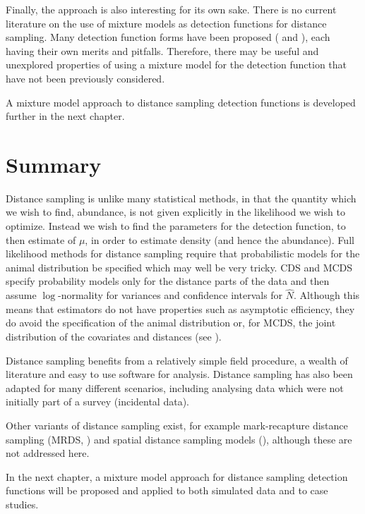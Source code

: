 Finally, the approach is also interesting for its own sake. There is no current literature on the use of mixture models as detection functions for distance sampling. Many detection function forms have been proposed (\cite{buckland92} and  \cite{gammadetfct}), each having their own merits and pitfalls. Therefore, there may be useful and unexplored properties of using a mixture model for the detection function that have not been previously considered.

A mixture model approach to distance sampling detection functions is developed further in the next chapter.

\section{Summary}
\label{cor-7s13}
Distance sampling is unlike many statistical methods, in that the quantity which we wish to find, abundance, is not given explicitly in the likelihood we wish to optimize. Instead we wish to find the parameters for the detection function, to then estimate of $\mu$, in order to estimate density (and hence the abundance). Full likelihood methods for distance sampling require that probabilistic models for the animal distribution be specified which may well be very tricky. CDS and MCDS specify probability models only for the distance parts of the data and then assume $\log$-normality for variances and confidence intervals for $\hat{N}$. Although this means that estimators do not have  properties such as asymptotic efficiency, they do avoid the specification of the animal distribution or, for MCDS, the joint distribution of the covariates and distances (see \cite[p. 6 and pp. 31-33]{ADS}). 

Distance sampling benefits from a relatively simple field procedure, a wealth of literature and easy to use software for analysis. Distance sampling has also been adapted for many different scenarios, including analysing data which were\label{cor-r1-7} not initially part of a survey (incidental data).

Other variants of distance sampling exist, for example mark-recapture distance sampling (MRDS, \cite{mrdspaper}) and spatial distance sampling models (\cite[chapter 4]{ADS}), although these are not addressed here.

In the next chapter, a mixture model approach for distance sampling detection functions will be proposed and applied to both simulated data and to case studies.
